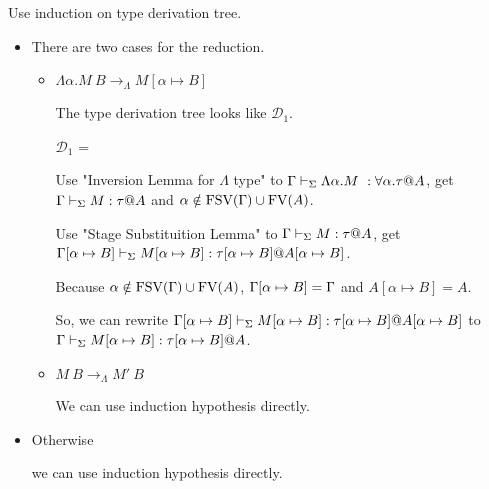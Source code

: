 Use induction on type derivation tree.
	
\begin{itemize}
	\newcommand{\R}{\longrightarrow_{\Lambda}}
	\item \TIns
	      	      	      	      	      	      		      	      	      	      
	      There are two cases for the reduction.
	      \begin{itemize}
	      	\item $\Lambda\alpha.M\ B \R M[\alpha \mapsto B]$
	      	      	      	      	      	      	      	      	      	      	      	      		      	      	      	      	      	      	      	      
	      	      The type derivation tree looks like $\mathcal{D}_1$.
	      	      	      	      	      	      	      	      	      	      	      	      		      	      	      	      	      	      	      	      
	      	      $\mathcal{D}_1$ = 
	      	      {}
	      	      	      	      	      	      	      	      	      	      	      	      		      	      	      	      	      	      	      	      
	      	      Use "Inversion Lemma for $\Lambda$ type" to $\Gamma \vdash_\Sigma \Lambda\alpha.M\ : \forall\alpha.\tau @ A$,
	      	      get $\Gamma \vdash_\Sigma M : \tau @ A$ and $\alpha \notin \text{FSV}(\Gamma) \cup \text{FV}(A)$.
	      	      	      	      	      	      	      	      	      	      	      	      		      	      	      	      	      	      	      	      
	      	      Use "Stage Substituition Lemma" to $\Gamma \vdash_\Sigma M : \tau @ A$,
	      	      get $\Gamma[\alpha \mapsto B] \vdash_\Sigma M[\alpha \mapsto B] : \tau[\alpha \mapsto B] @ A[\alpha \mapsto B]$.
	      	      	      	      	      	      	      	      	      	      	      	      		      	      	      	      	      	      	      	      
	      	      Because $\alpha \notin \text{FSV}(\Gamma) \cup \text{FV}(A)$, $\Gamma[\alpha \mapsto B] = \Gamma$ and $A[\alpha \mapsto B] = A$.
	      	      	      	      	      	      	      	      	      	      	      	      		      	      	      	      	      	      	      	      
	      	      So, we can rewrite $\Gamma[\alpha \mapsto B] \vdash_\Sigma M[\alpha \mapsto B] : \tau[\alpha \mapsto B] @ A[\alpha \mapsto B]$ to
	      	      $\Gamma \vdash_\Sigma M[\alpha \mapsto B] : \tau[\alpha \mapsto B] @ A$.
	      	\item $M\ B \R M'\ B$
	      	      	      	      	      	      	      	      	      	      	      	      		      	      	      	      	      	      	      	      
	      	      We can use induction hypothesis directly.
	      \end{itemize}
	      	      	      	      	      	      		      	      	      	      
	\item Otherwise
	      	      	      	      	      	      		      	      	      	      
	      we can use induction hypothesis directly.
\end{itemize}
	
